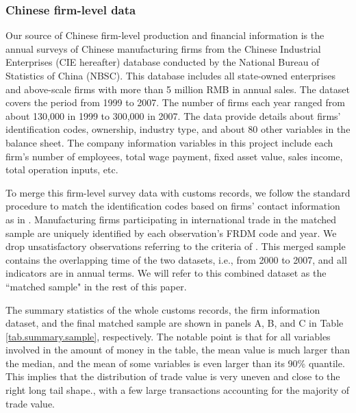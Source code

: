\documentclass[12pt]{article}
\begin{document}
\subsubsection{Chinese firm-level data} \label{Data-CIE}

Our source of Chinese firm-level production and financial information is the annual surveys of Chinese manufacturing firms from the Chinese Industrial Enterprises (CIE hereafter) database conducted by the National Bureau of Statistics of China (NBSC). This database includes all state-owned enterprises and above-scale firms with more than 5 million RMB in annual sales. The dataset covers the period from 1999 to 2007. The number of firms each year ranged from about 130,000 in 1999 to 300,000 in 2007. The data provide details about firms’ identification codes, ownership, industry type, and about 80 other variables in the balance sheet. The company information variables in this project include each firm's number of employees, total wage payment, fixed asset value, sales income, total operation inputs, etc.

To merge this firm-level survey data with customs records, we follow the standard procedure to match the identification codes based on firms' contact information as in \cite{fan-li-yeaple2015}. Manufacturing firms participating in international trade in the matched sample are uniquely identified by each observation's FRDM code and year. We drop unsatisfactory observations referring to the criteria of \cite{bkl2021}. This merged sample contains the overlapping time of the two datasets, i.e., from 2000 to 2007, and all indicators are in annual terms. We will refer to this combined dataset as the ``matched sample" in the rest of this paper.

The summary statistics of the whole customs records, the firm information dataset, and the final matched sample are shown in panels A, B, and C in Table \ref{tab.summary.sample}, respectively. The notable point is that for all variables involved in the amount of money in the table, the mean value is much larger than the median, and the mean of some variables is even larger than its 90\% quantile. This implies that the distribution of trade value is very uneven and close to the right long tail shape., with a few large transactions accounting for the majority of trade value.
\end{document}

